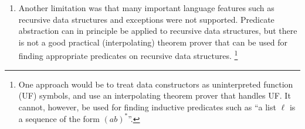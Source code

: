 \begin{enumerate}
%


%
%

\item Another limitation was that many important language
  features such as recursive data structures and exceptions were not supported.
  Predicate abstraction can in principle be applied to recursive data structures, but there is not a good practical (interpolating) theorem prover 
 that can be used for finding appropriate predicates on 
 recursive data structures.%
\footnote{One approach would be to treat data constructors as uninterpreted
  function (UF) symbols, and use an interpolating theorem prover that handles
  UF. It cannot, however, be used for finding inductive predicates such as
  ``a list \(\ell\) is a sequence of the form \((ab)^*\)''.}


\end{enumerate}
